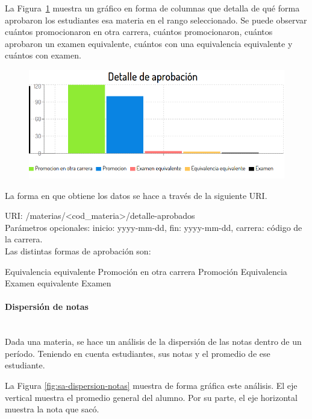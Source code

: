 La Figura~\ref{fig:sa-detalle-aprobacion} muestra un gráfico en forma de columnas que detalla de qué forma aprobaron los estudiantes esa materia en el rango seleccionado. Se puede observar cuántos promocionaron en otra carrera, cuántos promocionaron, cuántos aprobaron un examen equivalente, cuántos con una equivalencia equivalente y cuántos con examen.

\begin{figure}[H]
  \centering
    \includegraphics[scale=0.4]{images/seguimiento-academico/sa-detalleaprobacion.png}
  \label{fig:sa-detalle-aprobacion}
\end{figure}

La forma en que obtiene los datos se hace a través de la siguiente URI.

URI: /materias/<cod\_materia>/detalle-aprobados \\

Parámetros opcionales: inicio: yyyy-mm-dd, fin: yyyy-mm-dd, carrera: código de la carrera. \\

Las distintas formas de aprobación son:

\begin{outline}
    \2 Equivalencia equivalente
    \2 Promoción en otra carrera
    \2 Promoción
    \2 Equivalencia
    \2 Examen equivalente
    \2 Examen
\end{outline}

\paragraph{Dispersión de notas}\mbox{}\\

Dada una materia, se hace un análisis de la dispersión de las notas dentro de un período. Teniendo en cuenta estudiantes, sus notas y el promedio de ese estudiante.

La Figura \ref{fig:sa-dispersion-notas} muestra de forma gráfica este análisis. El eje vertical muestra el promedio general del alumno. Por su parte, el eje horizontal muestra la nota que sacó.

